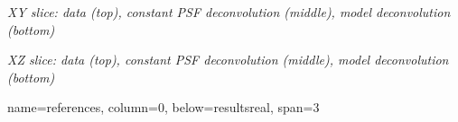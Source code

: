 \documentclass[a0paper,portrait,fontscale=0.35]{baposter}
\newcommand{\mycaption}[1]{
  {
    \smaller
    \emph{#1}
  }
}
\theoremstyle{plain}
\theoremstyle{plain}
\theoremstyle{definition}
\theoremstyle{plain}
\theoremstyle{definition}
\begin{document}
\begin{poster}
{\begin{minipage}[t]{0.48\textwidth}
\begin{minipage}[t]{0.49\textwidth}
      \vspace{-1em}
      \begin{center}
        \mycaption{
          XY slice: data (top), constant PSF deconvolution (middle),
          model deconvolution (bottom)
        }
      \end{center}

      \vspace{-0.5em}
      \centering

      \vspace{-1em}
      \begin{center}
        \mycaption{
          XZ slice: data (top), constant PSF deconvolution (middle),
          model deconvolution (bottom)
        }
      \end{center}
    \end{minipage}
  \end{minipage}
  \vspace{-1em}
}

{name=references, column=0,  below=resultsreal, span=3}
{
  \tiny
  \renewcommand{\section}[2]{\vspace{0.05em}}	%
  
}


\end{poster}
\end{document}

